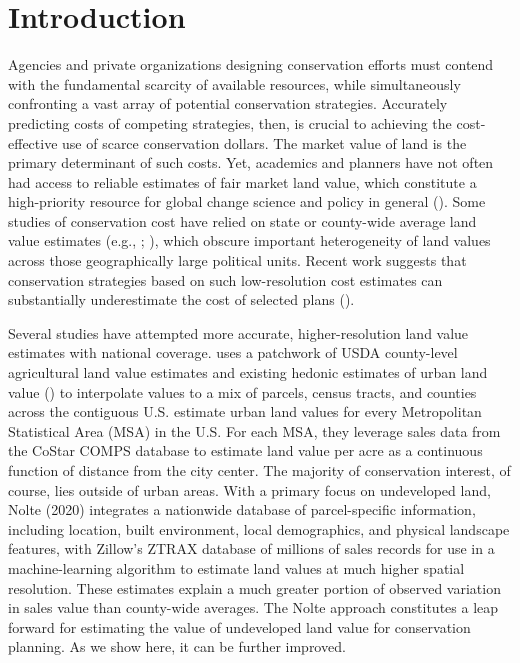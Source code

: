 \documentclass[12pt]{article}
\begin{document}
\newpage

\section{Introduction}

Agencies and private organizations designing conservation efforts must contend with the fundamental scarcity of available resources, while simultaneously confronting a vast array of potential conservation strategies. Accurately predicting costs of competing strategies, then, is crucial to achieving the cost-effective use of scarce conservation dollars. The market value of land is the primary determinant of such costs. Yet, academics and planners have not often had access to reliable estimates of fair market land value, which constitute a high-priority resource for global change science and policy in general (\cite{Coomes2018GeospatialPolicy}). Some studies of conservation cost have relied on state or county-wide average land value estimates (e.g., \cite{Withey2012MaximisingUSA}; \cite{Lawler2020PlanningConfiguration}),
which obscure important heterogeneity of land values across those geographically large political units. Recent work suggests that conservation strategies based on such low-resolution cost estimates can substantially underestimate the cost of selected plans (\cite{Nolte2020High-resolutionStates}). 

Several studies have attempted more accurate, higher-resolution land value estimates with national coverage. \textcite{Larson2015} uses a patchwork of USDA county-level agricultural land value estimates and existing hedonic estimates of urban land value (\cite{Kuminoff2013}) to interpolate values to a mix of parcels, census tracts, and counties across the contiguous U.S. \textcite{Albouy2018} estimate urban land values for every Metropolitan Statistical Area (MSA) in the U.S. For each MSA, they leverage sales data from the CoStar COMPS database to estimate land value per acre as a continuous function of distance from the city center. The majority of conservation interest, of course, lies outside of urban areas. With a primary focus on undeveloped land, Nolte (2020) integrates a nationwide database of parcel-specific information, including location, built environment, local demographics, and physical landscape features, with Zillow’s ZTRAX database of millions of sales records for use in a machine-learning algorithm to estimate land values at much higher spatial resolution. These estimates explain a much greater portion of observed variation in sales value than county-wide averages. The Nolte approach constitutes a leap forward for estimating the value of undeveloped land value for conservation planning. As we show here, it can be further improved.
\end{document}
